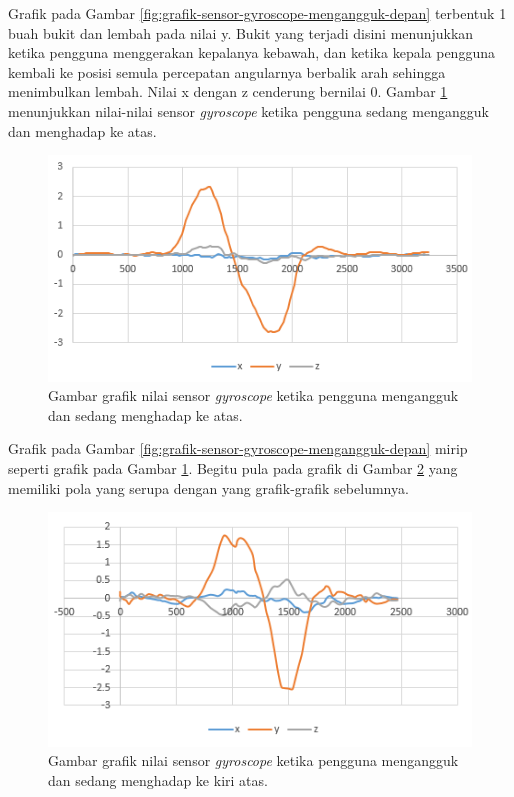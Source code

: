 Grafik pada Gambar \ref{fig:grafik-sensor-gyroscope-mengangguk-depan} terbentuk 1 buah bukit dan lembah pada nilai y. Bukit yang terjadi disini menunjukkan ketika pengguna menggerakan kepalanya kebawah, dan ketika kepala pengguna kembali ke posisi semula percepatan angularnya berbalik arah sehingga menimbulkan lembah. Nilai x dengan z cenderung bernilai 0. Gambar \ref{fig:grafik-sensor-gyroscope-mengangguk-atas} menunjukkan nilai-nilai sensor \textit{gyroscope} ketika pengguna sedang mengangguk dan menghadap ke atas.

\begin{figure}[htbp]
\centering
\includegraphics[scale=1]{Gambar/grafik-sensor-gyroscope-mengangguk-atas.png}
\caption{Gambar grafik nilai sensor \textit{gyroscope} ketika pengguna mengangguk dan sedang menghadap ke atas.} 
\label{fig:grafik-sensor-gyroscope-mengangguk-atas}
\end{figure}

Grafik pada Gambar \ref{fig:grafik-sensor-gyroscope-mengangguk-depan} mirip seperti grafik pada Gambar \ref{fig:grafik-sensor-gyroscope-mengangguk-atas}. Begitu pula pada grafik di Gambar \ref{fig:grafik-sensor-gyroscope-mengangguk-kiri-atas} yang memiliki pola yang serupa dengan yang grafik-grafik sebelumnya.

\begin{figure}[htbp]
\centering
\includegraphics[scale=1]{Gambar/grafik-sensor-gyroscope-mengangguk-kiri-atas.png}
\caption{Gambar grafik nilai sensor \textit{gyroscope} ketika pengguna mengangguk dan sedang menghadap ke kiri atas.} 
\label{fig:grafik-sensor-gyroscope-mengangguk-kiri-atas}
\end{figure}

